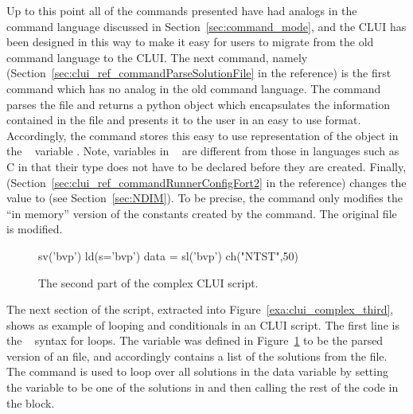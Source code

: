 Up to this point all of the commands presented have had
analogs in the command language discussed in 
Section~\ref{sec:command_mode}, and the \AUTOc CLUI has
been designed in this way to make it easy for users to
migrate from the old command language to the
\AUTOc CLUI.  The next command, namely 
(Section~\ref{sec:clui_ref_commandParseSolutionFile} in the reference)
is the first command which has no analog in the 
old command language.
The command  parses the file 
and returns a python object which encapsulates the
information contained in the file and presents it to the
user in an easy to use format.  Accordingly, the
command  stores this easy to
use representation of the object in the \python~
variable .
Note, variables in \python~ are different from those in languages
such as {\cal C} in that their type does not have to be
declared before they are created.
Finally,   
(Section~\ref{sec:clui_ref_commandRunnerConfigFort2} in the reference)
changes the  value to  (see Section~\ref{sec:NDIM}).
To be precise, the command  only modifies
the ``in memory'' version of the \AUTOc constants created
by the  command.
The original file  is  modified.

\begin{figure}[htbp]
{\small \begin{center} \begin{boxedverbatim}
sv('bvp')
ld(s='bvp')
data = sl('bvp')
ch("NTST",50)
\end{boxedverbatim}
\end{center} 
}
\caption[The second part of the  complex \AUTOc CLUI script.]
{The second part of the  complex \AUTOc CLUI script.}
\label{exa:clui_complex_second}
\end{figure}

The next section of the script, extracted into 
Figure~\ref{exa:clui_complex_third}, shows as example
of looping and conditionals in an \AUTOc CLUI script.
The first line  is
the \python~ syntax for loops.  The  variable
was defined in Figure~\ref{exa:clui_complex_second}
to be the parsed version of an \AUTOc {}
file, and accordingly contains a list of the solutions
from the  file.  The command 
 is used to loop
over all solutions in the data variable by 
setting the variable  to
be one of the solutions in 
and then calling the rest of the code in the
block.  

